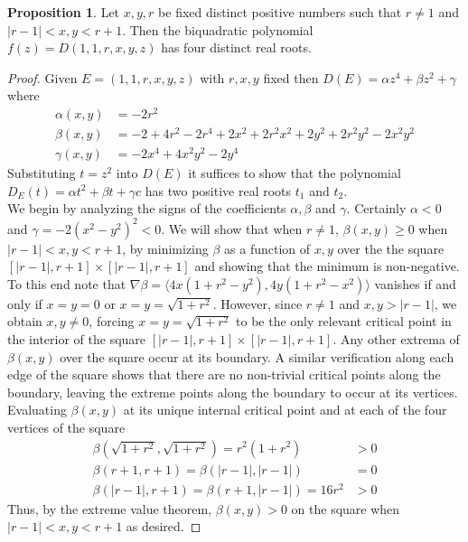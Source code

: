 \documentclass{article}
\theoremstyle{definition}
\newtheorem{Proposition}{Proposition}
\renewcommand{\|}{|}
\begin{document}
\begin{Proposition}\label{prop:cayleymengerprop}
   Let $x,y,r$ be fixed distinct positive numbers such that $r \neq 1$ and $|r-1| < x,y < r+1$.
   Then the biquadratic polynomial $f(z) = D(1,1,r,x,y,z)$  has four distinct real roots.
\end{Proposition}
\begin{proof}
   Given $E = (1,1,r,x,y,z)$ with $r,x,y$  fixed then $D(E) = \alpha z^4 + \beta z^2 + \gamma$
    where
   \begin{equation*}
       \begin{split}
           \alpha(x,y) &= -2r^2\\
           \beta(x,y) &= -2+4r^2-2r^4+2x^2+2r^2x^2+2y^2+2r^2y^2-2x^2y^2\\
           \gamma(x,y) &= -2x^4 + 4x^2y^2 - 2y^4
       \end{split}
   \end{equation*}
   Substituting $t=z^2$ into $D(E)$ it suffices to show that the polynomial  $D_E(t) = \alpha t^2+\beta t+\gamma c$  has two positive real roots $t_1$ and $t_2$. \\

    We begin by analyzing the signs of the coefficients $\alpha,\beta$ and $\gamma$. Certainly $\alpha < 0$ and $\gamma = -2(x^2-y^2)^2 < 0$. 
    We will show that when $r \neq 1$, $\beta (x,y) \geq 0$ when $|r-1| < x,y < r+1$, by minimizing $\beta$ as a function of $x, y$ over the
    the square $[|r-1|,r+1] \times [|r-1|, r+1]$ and showing that the minimum is non-negative. To this end note that 
    $\nabla \beta = \langle 4x(1+r^2-y^2), 4y(1+r^2-x^2)\rangle$ vanishes if and only if $x=y=0$ or $x=y=\sqrt{1+r^2}$. However, since $r \neq 1$ and $x,y > |r-1|$, we obtain $x,y\neq 0$, forcing $x=y=\sqrt{1+r^2}$ to be the only relevant critical point in the interior of 
    the square $[|r-1|, r+1] \times [|r-1|, r+1]$. Any other extrema of $\beta(x,y)$ over the square  occur at its boundary. A similar verification along each edge of the square shows that there are no non-trivial critical points along the boundary, leaving the extreme points along the boundary to occur at its vertices. Evaluating $\beta(x,y)$ at its unique internal critical point and at each of the four vertices of the square
    \begin{equation*}
        \begin{split}
            \beta(\sqrt{1+r^2}, \sqrt{1+r^2}) = r^2(1+r^2) &> 0\\
            \beta(r+1,r+1) = \beta(|r-1|,|r-1|) &= 0\\
            \beta(|r-1|,r+1) = \beta(r+1,|r-1|) = 16r^2 &> 0
        \end{split}
    \end{equation*}
    Thus, by the extreme value theorem, $\beta(x,y) >0$ on the square when $|r-1| < x,y < r+1$ as desired. 
    


\end{proof}
\end{document}
